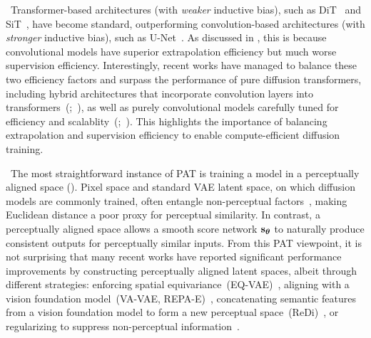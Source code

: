{\textbf{}~Transformer-based architectures (with \emph{weaker} inductive bias), such as DiT~\citep{peebles2023scalable} and SiT~\citep{ma2024sit}, have become standard, outperforming convolution-based architectures (with \emph{stronger} inductive bias), such as U-Net~\citep{ronneberger2015u,ho2020denoising}. As discussed in , this is because convolutional models have superior extrapolation efficiency but much worse supervision efficiency. Interestingly, recent works have managed to balance these two efficiency factors and surpass the performance of pure diffusion transformers, including hybrid architectures that incorporate convolution layers into transformers~(;~), as well as purely convolutional models carefully tuned for efficiency and scalablity~(;~). This highlights the importance of balancing extrapolation and supervision efficiency to enable compute-efficient diffusion training.
}{
\textbf{}~The most straightforward instance of PAT is training a model in a perceptually aligned space (). Pixel space and standard VAE latent space, on which diffusion models are commonly trained, often entangle non-perceptual factors~\citep{skorokhodov2025improving}, making Euclidean distance a poor proxy for perceptual similarity. In contrast, a perceptually aligned space allows a smooth score network ${\mathbf{s}}_{\boldsymbol{\theta}}$ to naturally produce consistent outputs for perceptually similar inputs. From this PAT viewpoint, it is not surprising that many recent works have reported significant performance improvements by constructing perceptually aligned latent spaces, albeit through different strategies: enforcing spatial equivariance~(EQ-VAE)~\citep{kouzelis2025eq}, aligning with a vision foundation model~(VA-VAE, REPA-E)~\citep{yao2025reconstruction,leng2025repa}, concatenating semantic features from a vision foundation model to form a new perceptual space~(ReDi)~\citep{kouzelis2025boosting}, or regularizing to suppress non-perceptual information~\citep{skorokhodov2025improving}.

}
